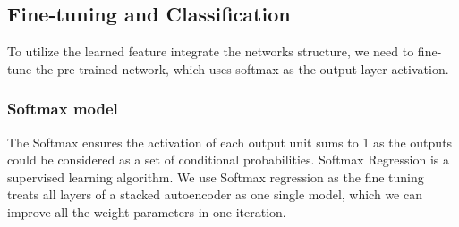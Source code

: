 \documentclass{bmcart}
\begin{document}
\subsection*{Fine-tuning and Classification}
To utilize the learned feature integrate the networks structure, we need to fine-tune the pre-trained network, which uses softmax as the output-layer activation. 

\subsubsection*{Softmax model}The Softmax ensures the activation of each output unit sums to 1 as the outputs could be considered as a set of conditional probabilities. Softmax Regression is a supervised learning algorithm. We use Softmax regression as the fine tuning treats all layers of a stacked autoencoder as one single model, which we can improve all the weight parameters in one iteration. 
\end{document}
